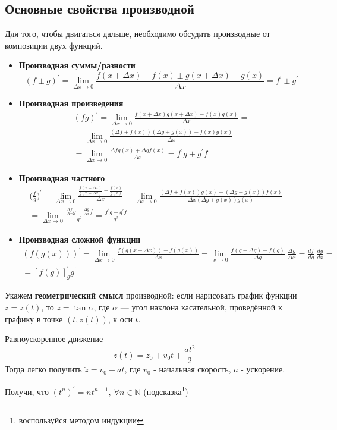 \subsection{Основные свойства производной}
Для того, чтобы двигаться дальше, необходимо обсудить производные от композиции двух функций.
\begin{itemize}
    \item \textbf{Производная суммы/разности}
    \begin{equation*}
        (f \pm g)^{'} = \lim_{\Delta x \rightarrow 0} \frac{f(x + \Delta x) - f(x) \pm g(x + \Delta x) - g(x)}{\Delta x} = f^{'} \pm g^{'}
    \end{equation*}
    \item \textbf{Производная произведения}
    \begin{multline*}
        (fg)^{'} = \lim_{\Delta x \rightarrow 0} \frac{f(x + \Delta x)g(x + \Delta x) - f(x)g(x)}{\Delta x} = \\
        =\lim_{\Delta x \rightarrow 0} \frac{(\Delta f + f(x))(\Delta g + g(x)) - f(x)g(x)}{\Delta x} = \\
        = \lim_{\Delta x \rightarrow 0} \frac{\Delta f g(x) + \Delta g f(x)}{\Delta x} = f^{'}g + g^{'} f
    \end{multline*}
    \item \textbf{Производная частного}
    \begin{multline*}
        \bigl(\frac{f}{g} \bigr)^{'} = \lim_{\Delta x \rightarrow 0} \frac{\frac{f(x + \Delta x)}{g(x + \Delta x)} - \frac{f(x)}{g(x)}}{\Delta x} = \lim_{\Delta x \rightarrow 0} \frac{(\Delta f + f(x))g(x) - (\Delta g + g(x))f(x)}{\Delta x (\Delta g + g(x)) g(x)} =\\
        = \lim_{\Delta x \rightarrow 0} \frac{\frac{\Delta f}{\Delta x} g - \frac{\Delta g}{\Delta x} f}{g^2} = \frac{f^{'} g - g^{'} f}{g^2}
    \end{multline*}
    \item \textbf{Производная сложной функции}
    \begin{multline*}
        (f(g(x)))^{'} = \lim_{\Delta x \rightarrow 0} \frac{f(g(x + \Delta x)) - f(g(x))}{\Delta x} = \lim_{x \rightarrow 0}\frac{f(g + \Delta g) - f(g)}{\Delta g}\ \frac{\Delta g}{\Delta x} = \frac{df}{dg}\ \frac{dg}{dx} =\\
        = [f(g)]^{'}_{g} g^{'}
    \end{multline*}
\end{itemize}
Укажем \textbf{геометрический смысл} производной: если нарисовать график функции $z=z(t)$, то $\dot{z} = \tan \alpha$, где $\alpha$ — угол наклона касательной, проведённой к графику в точке $(t, z(t))$, к оси $t$.
\begin{example}
    Равноускоренное движение
    \begin{equation*}
        z(t) = z_0 + v_0t + \frac{at^2}{2}
    \end{equation*}
    Тогда легко получить $\dot{z}= v_0 + at$, где $v_0$ - начальная скорость, $a$ - ускорение.
\end{example}
\begin{prac}
    Получи, что $(t^{n})^{'} = n t^{n-1},\ \forall n \in \mathbb{N}$ (подсказка\footnote{воспользуйся методом индукции})
\end{prac}
